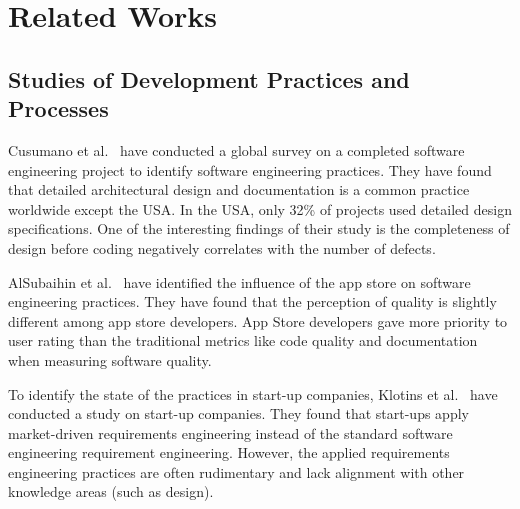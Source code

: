 \section{Related Works}
\label{related_works}

\subsection{Studies of Development Practices and Processes}
\label{dev practice study}
Cusumano et al.~\cite{Cusumano2003} have conducted a global survey on a completed software engineering project to identify software engineering practices. They have found that detailed architectural design and documentation is a common practice worldwide except the USA. In the USA, only 32\% of projects used detailed design specifications. One of the interesting findings of their study is the completeness of design before coding negatively correlates with the number of defects.

AlSubaihin et al.~\cite{AlSubaihin2019} have identified the influence of the app store on software engineering practices. They have found that the perception of quality is slightly different among app store developers. App Store developers gave more priority to user rating than the traditional metrics like code quality and documentation when measuring software quality.

To identify the state of the practices in start-up companies, Klotins et al.~\cite{Klotins2018} have conducted a study on start-up companies. They found that start-ups apply market-driven requirements engineering instead of the standard software engineering requirement engineering. However, the applied requirements engineering practices are often rudimentary and lack alignment with other knowledge areas (such as design).

